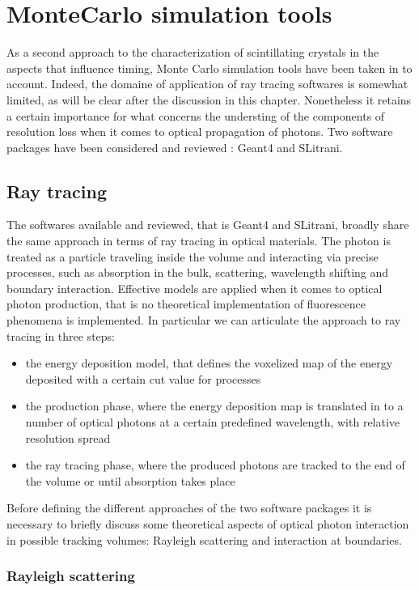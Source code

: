 
\chapter{MonteCarlo simulation tools}

As a second approach to the characterization of scintillating crystals in the aspects that influence timing, Monte Carlo simulation tools have been taken in to account. Indeed, the domaine of application of ray tracing softwares is somewhat limited, as will be clear after the discussion in this chapter. Nonetheless it retains a certain importance for what concerns the understing of the components of resolution loss when it comes to optical propagation of photons. Two software packages have been considered and reviewed \cite{Pizzi2012}: Geant4 and SLitrani.

\section{Ray tracing}

The softwares available and reviewed, that is Geant4 and SLitrani, broadly share the same approach in terms of ray tracing in optical materials. 
The photon is treated as a particle traveling inside the volume and interacting via precise processes, such as absorption in the bulk, scattering, wavelength shifting and boundary interaction. 
Effective models are applied when it comes to optical photon production, that is no theoretical implementation of fluorescence phenomena is implemented. In particular we can articulate the approach to ray tracing in three steps:
\begin{itemize}
\item the energy deposition model, that defines the voxelized map of the energy deposited with a certain cut value for processes
\item the production phase, where the energy deposition map is translated in to a number of optical photons at a certain predefined wavelength, with relative resolution spread
\item the ray tracing phase, where the produced photons are tracked to the end of the volume or until absorption takes place
\end{itemize}
Before defining the different approaches of the two software packages it is necessary to briefly discuss some theoretical aspects of optical photon interaction in possible tracking volumes: Rayleigh scattering and interaction at boundaries.

\subsection{Rayleigh scattering}


